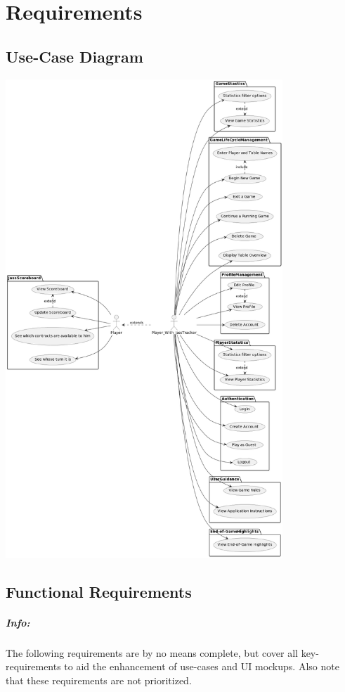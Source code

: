 \chapter{Requirements}

\section{Use-Case Diagram}
\includegraphics[height=18cm]{resources/diagrams/use-case}


\section {Functional Requirements}

\paragraph{Info:}
The following requirements are by no means complete, but cover all key-requirements to aid the enhancement of use-cases and UI mockups. 
Also note that these requirements are not prioritized.

